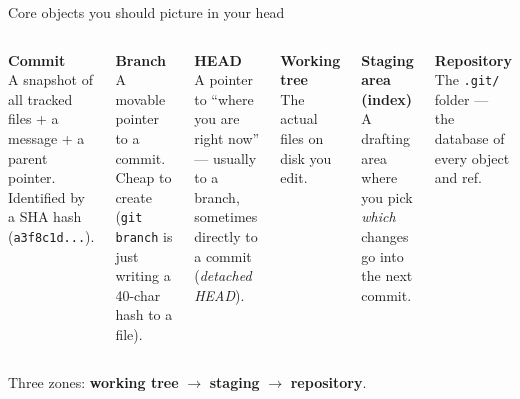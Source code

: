 \documentclass[10pt,aspectratio=169]{beamer}
\begin{document}
\begin{frame}{Core objects you should picture in your head}
  \begin{columns}[T]
    \textbf{\color{ghAccent}Commit}\\
    A snapshot of all tracked files + a message + a parent pointer.
    Identified by a SHA hash (\texttt{a3f8c1d...}).

    \vspace{0.6em}
    \textbf{\color{ghAccent}Branch}\\
    A movable pointer to a commit. Cheap to create
    (\texttt{git branch} is just writing a 40-char hash to a file).

    \vspace{0.6em}
    \textbf{\color{ghAccent}HEAD}\\
    A pointer to ``where you are right now'' --- usually to a branch,
    sometimes directly to a commit (\emph{detached HEAD}).

    \textbf{\color{ghAccent}Working tree}\\
    The actual files on disk you edit.

    \vspace{0.6em}
    \textbf{\color{ghAccent}Staging area (index)}\\
    A drafting area where you pick \emph{which} changes go into the next commit.

    \vspace{0.6em}
    \textbf{\color{ghAccent}Repository}\\
    The \texttt{.git/} folder --- the database of every object and ref.
  \end{columns}

  \vspace{0.8em}
  \begin{center}
    \footnotesize\color{ghMuted}
    Three zones: \textbf{working tree} $\to$ \textbf{staging} $\to$ \textbf{repository}.
  \end{center}
\end{frame}
\end{document}
